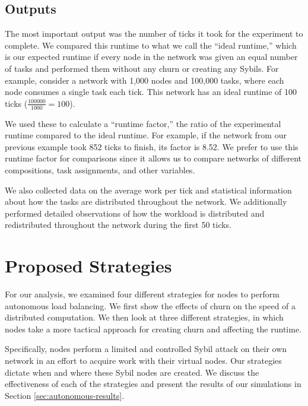 \documentclass[10pt,conference]{IEEEtran}
\begin{document}
%

\subsection{Outputs}
The most important output was the number of ticks it took for the experiment to complete.
We compared this runtime to what we call the ``ideal runtime,'' which is our expected runtime if every node in the network was given an equal number of tasks and performed them without any churn or creating any Sybils.
For example, consider a network with 1,000 nodes and 100,000 tasks, where each node consumes a single task each tick. 
This network has an ideal runtime of 100 ticks ($ \frac{100000}{1000} = 100$).

We used these to calculate a ``runtime factor,'' the ratio of the experimental runtime compared to the ideal runtime.
For example, if the network from our previous example took 852 ticks to finish, its factor is 8.52.
We prefer to use this runtime factor for comparisons since it allows us to compare networks of different compositions, task assignments, and other variables.

We also collected data on the average work per tick and statistical information about how the tasks are distributed throughout the network.
We additionally performed detailed observations of how the workload is  distributed and redistributed throughout the network during the first 50 ticks.

\section{Proposed Strategies}
\label{sec:strategies}

For our analysis, we examined four different strategies for nodes to perform autonomous load balancing.
We first show the effects of churn on the speed of a distributed computation.
We then look at three different strategies, in which nodes take a more tactical approach for creating churn and affecting the runtime.

Specifically, nodes perform a limited and controlled Sybil attack \cite{sybil} on their own network in an effort to acquire work with their virtual nodes.
Our strategies dictate when and where these Sybil nodes are created.
We discuss the effectiveness of each of the strategies and present the results of our simulations in Section \ref{sec:autonomous-results}.
\end{document}

